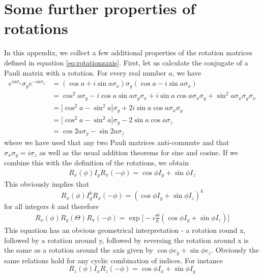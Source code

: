 \documentclass[a4paper, draft]{article}
\theoremstyle{own}
\theoremstyle{remark}
\begin{document}
\appendix

\section{Some further properties of rotations}\label{app:rotations}


In this appendix, we collect a few additional properties of the rotation matrices defined in equation \eqref{eq:rotationzaxis}. First, let us calculate the conjugate of a Pauli matrix with a rotation. For every real number $a$, we have
\begin{align*}
e^{ia\sigma_x} \sigma_y e^{-ia\sigma_x} &= (\cos a + i \sin a \sigma_x) \sigma_y (\cos a - i \sin a \sigma_x) \\&= \cos^2 a \sigma_y  -i \cos a \sin a \sigma_y \sigma_x 
+ i \sin a \cos a \sigma_x \sigma_y
+ \sin^2 a \sigma_x \sigma_y \sigma_x \\
&= \big[ \cos^2 a -\sin^2  a\big] \sigma_y + 2 i \sin a \cos a \sigma_x \sigma_y \\
&= \big[ \cos^2 a -\sin^2  a\big] \sigma_y - 2 \sin a \cos a \sigma_z \\
&= \cos 2a \sigma_y - \sin 2a \sigma_z
\end{align*}
where we have used that any two Pauli matrices anti-commute and that $\sigma_x \sigma_y = i \sigma_z$ as well as the usual addition theorems for sine and cosine. If we combine this with the definition of the rotations, we obtain
\begin{align}
\label{eq:infinitesimalsandwich}
R_x(\phi) I_y R_x(-\phi) = \cos \phi I_y + \sin \phi I_z
\end{align}
This obviously implies that
$$
R_x(\phi) I_y^k R_x(-\phi) = \left( \cos \phi I_y + \sin \phi I_z \right)^k
$$
for all integers $k$ and therefore
\begin{align}
R_x(\phi) R_y(\Theta) R_x(-\phi) = \exp 
\big[ -i \frac{\Theta}{\hbar} (\cos \phi I_y + \sin \phi I_z)      \big] 
\end{align}
This equation has an obvious geometrical interpretation - a rotation round x, followed by a rotation around y, followed by reversing the rotation around x is the same as a rotation around the axis given by $\cos \phi e_y + \sin \phi e_z$. Obviously the same relations hold for any cyclic combination of indices. For instance
$$
R_z(\phi) I_x R_z(-\phi) = \cos \phi I_x + \sin \phi I_y
$$
\end{document}
